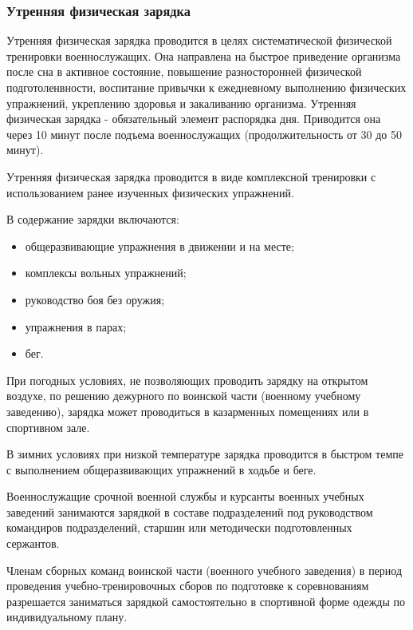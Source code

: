 \documentclass[a4paper]{article}
\begin{document}
    \subsubsection{Утренняя физическая зарядка}

    Утренняя физическая зарядка проводится в целях систематической физической тренировки военнослужащих. Она направлена на быстрое приведение организма после сна в активное состояние, повышение разносторонней физической подготоленвности, воспитание привычки к ежедневному выполнению физических упражнений, укреплению здоровья и закаливанию организма. Утренняя физическая зарядка - обязательный элемент распорядка дня. Приводится она через 10 минут после подъема военнослужащих (продолжительность от 30 до 50 минут).

    Утренняя физическая зарядка проводится в виде комплексной тренировки с использованием ранее изученных физических упражнений.

    В содержание зарядки включаются:

    \begin{itemize}
        \item общеразвивающие упражнения в движении и на месте;
        \item комплексы вольных упражнений;
        \item руководство боя без оружия;
        \item упражнения в парах;
        \item бег.
    \end{itemize}

    При погодных условиях, не позволяющих проводить зарядку на открытом воздухе, по решению дежурного по воинской части (военному учебному заведению), зарядка может проводиться в казарменных помещениях или в спортивном зале.

    В зимних условиях при низкой температуре зарядка проводится в быстром темпе с выполнением общеразвивающих упражнений в ходьбе и беге.

    Военнослужащие срочной военной службы и курсанты военных учебных заведений занимаются зарядкой в составе подразделений под руководством командиров подразделений, старшин или методически подготовленных сержантов.

    Членам сборных команд воинской части (военного учебного заведения) в период проведения учебно-тренировочных сборов по подготовке к соревнованиям разрешается заниматься зарядкой самостоятельно в спортивной форме одежды по индивидуальному плану.
\end{document}
